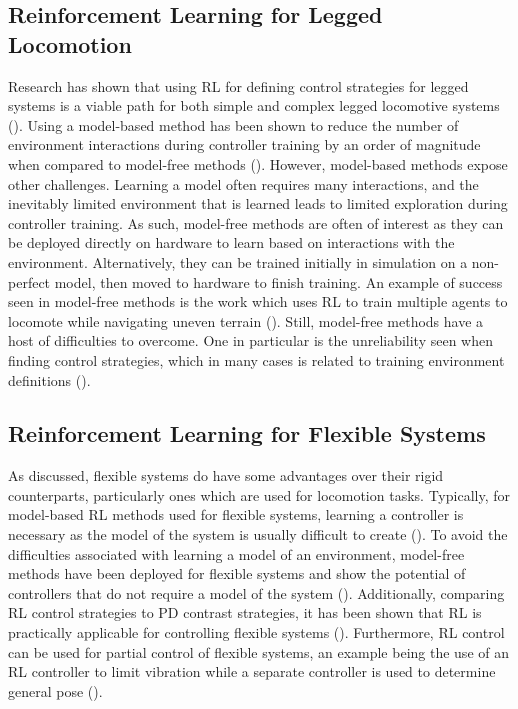 \documentclass{ifacconf}
\begin{document}
   \subsection{Reinforcement Learning for Legged Locomotion}  
      Research has shown that using RL for defining control strategies for legged systems is a viable path for both simple and complex legged locomotive systems (\cite{Reda2020c}). Using a model-based method has been shown to reduce the number of environment interactions during controller training by an order of magnitude when compared to model-free methods (\cite{Yang2019}). However, model-based methods expose other challenges. Learning a model often requires many interactions, and the inevitably limited environment that is learned leads to limited exploration during controller training. As such, model-free methods are often of interest as they can be deployed directly on hardware to learn based on interactions with the environment. Alternatively, they can be trained initially in simulation on a non-perfect model, then moved to hardware to finish training. An example of success seen in model-free methods is the work which uses RL to train multiple agents to locomote while navigating uneven terrain (\cite{Peng2016}). Still, model-free methods have a host of difficulties to overcome. One in particular is the unreliability seen when finding control strategies, which in many cases is related to training environment definitions (\cite{Reda2020c}).
      
   \subsection{Reinforcement Learning for Flexible Systems} 
      As discussed, flexible systems do have some advantages over their rigid counterparts, particularly ones which are used for locomotion tasks. Typically, for model-based RL methods used for flexible systems, learning a controller is necessary as the model of the system is usually difficult to create (\cite{Thuruthelb}). To avoid the difficulties associated with learning a model of an environment, model-free methods have been deployed for flexible systems and show the potential of controllers that do not require a model of the system (\cite{Dwiel2019d}). Additionally, comparing RL control strategies to PD contrast strategies, it has been shown that RL is practically applicable for controlling flexible systems (\cite{He2020f}). Furthermore, RL control can be used for partial control of flexible systems, an example being the use of an RL controller to limit vibration while a separate controller is used to determine general pose (\cite{Cui2019e}).  
\end{document}

